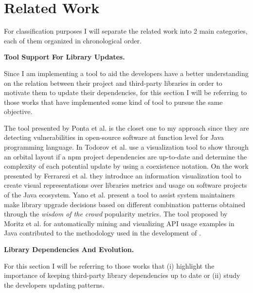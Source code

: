 \chapter{Related Work}
\label{sec:related_work}
For classification purposes I will separate the related work into 2 main categories, each of them organized in chronological order.

\vspace{5mm}
\textbf{Tool Support For Library Updates.}

Since I am implementing a tool to aid the developers have a better understanding on the relation between their project and third-party libraries in order to motivate them to update their dependencies, for this section I will be referring to those works that have implemented some kind of tool to pursue the same objective.

The tool presented by Ponta et al. \cite{Ponta:2018} is the closet one to my approach since they are detecting vulnerabilities in open-source software at function level for Java programming language. 
In \cite{todorov2017sol} Todorov et al. use a visualization tool to show through an orbital layout if a npm project dependencies are up-to-date and determine the complexity of each potential update by using a coexistence notation. 
On the work presented by Ferrarezi et al. \cite{ferrarezi2016libviews} they introduce an information visualization tool to create visual representations over libraries metrics and usage on software projects of the Java ecosystem. 
Yano et al. \cite{yano2015verxcombo} present a tool to assist system maintainers make library upgrade decisions based on different combination patterns obtained through the \textit{wisdom of the crowd} popularity metrics. 
The tool proposed by Moritz et al. \cite{moritz2013export} for automatically mining and visualizing API usage examples in Java contributed to the methodology used in the development of \tool.

\vspace{5mm}
\textbf{Library Dependencies And Evolution.}

For this section I will be referring to those works that (i) highlight the importance of keeping third-party library dependencies up to date or (ii) study the developers updating patterns.

